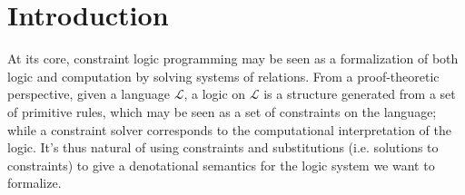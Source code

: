 \documentclass[sigplan,10pt]{acmart}\settopmatter{}
\begin{document}





\maketitle


\section{Introduction}

At its core, constraint logic programming may be seen as a formalization of both
logic and computation by solving systems of relations. From a proof-theoretic
perspective, given a language $\mathcal{L}$, a logic on $\mathcal{L}$ is a
structure generated from a set of primitive rules, which may be seen as a set of
constraints on the language; while a constraint solver corresponds to the
computational interpretation of the logic. It's thus natural of using
constraints and substitutions (i.e. solutions to constraints) to give a
denotational semantics for the logic system we want to formalize.\\
\end{document}

